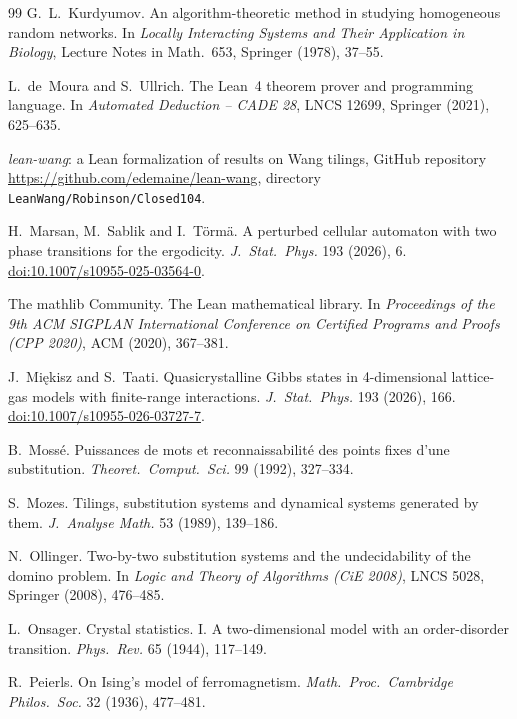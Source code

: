 \begin{thebibliography}{99}
 G.~L.~Kurdyumov. An algorithm-theoretic method in studying homogeneous random networks. In \emph{Locally Interacting Systems and Their Application in Biology}, Lecture Notes in Math.\ 653, Springer (1978), 37--55.

 L.~de~Moura and S.~Ullrich. The Lean~4 theorem prover and programming language. In \emph{Automated Deduction -- CADE 28}, LNCS 12699, Springer (2021), 625--635.

 \emph{lean-wang}: a Lean formalization of results on Wang tilings, GitHub repository \url{https://github.com/edemaine/lean-wang}, directory \texttt{LeanWang/Robinson/Closed104}.

 H.~Marsan, M.~Sablik and I.~T\"orm\"a. A perturbed cellular automaton with two phase transitions for the ergodicity. \emph{J.\ Stat.\ Phys.} 193 (2026), 6. \href{https://doi.org/10.1007/s10955-025-03564-0}{doi:10.1007/s10955-025-03564-0}.

 The mathlib Community. The Lean mathematical library. In \emph{Proceedings of the 9th ACM SIGPLAN International Conference on Certified Programs and Proofs (CPP 2020)}, ACM (2020), 367--381.

 J.~Mi\k{e}kisz and S.~Taati. Quasicrystalline Gibbs states in 4-dimensional lattice-gas models with finite-range interactions. \emph{J.\ Stat.\ Phys.} 193 (2026), 166. \href{https://doi.org/10.1007/s10955-026-03727-7}{doi:10.1007/s10955-026-03727-7}.

 B.~Moss\'e. Puissances de mots et reconnaissabilit\'e des points fixes d'une substitution. \emph{Theoret.\ Comput.\ Sci.} 99 (1992), 327--334.

 S.~Mozes. Tilings, substitution systems and dynamical systems generated by them. \emph{J.\ Analyse Math.} 53 (1989), 139--186.

 N.~Ollinger. Two-by-two substitution systems and the undecidability of the domino problem. In \emph{Logic and Theory of Algorithms (CiE 2008)}, LNCS 5028, Springer (2008), 476--485.

 L.~Onsager. Crystal statistics. I. A two-dimensional model with an order-disorder transition. \emph{Phys.\ Rev.} 65 (1944), 117--149.

 R.~Peierls. On Ising's model of ferromagnetism. \emph{Math.\ Proc.\ Cambridge Philos.\ Soc.} 32 (1936), 477--481.


\end{thebibliography}
